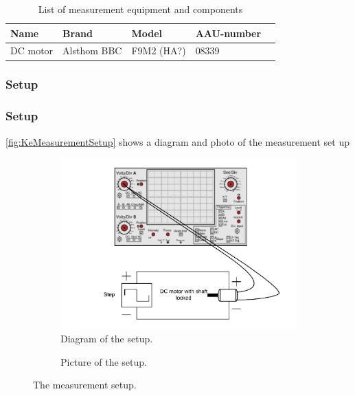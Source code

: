 \begin{table}[htbp]
	\centering
	\caption{List of measurement equipment and components}\label{tab_appendix:LaSetUp}
	
	\begin{tabularx}{\textwidth}{lXXXX}
		Name 				& Brand	& Model & AAU-number									\\ \toprule \rowcolor{lightGrey}
		
		DC motor & Alsthom BBC & F9M2 (HA?)& 08339 
	\end{tabularx}
\end{table}


\subsubsection*{Setup}

\subsubsection*{Setup}
\autoref{fig:KeMeasurementSetup} shows a diagram and photo of the measurement set up
\begin{figure}[htbp]
	\centering
	\begin{subfigure}{0.50\textwidth}
		\includegraphics[width=\textwidth]{figures/appendix/Motor&GearTests/RmLmDiagram}
		\caption{Diagram of the setup.} \label{fig:RmLmMeasurementDiagram}
	\end{subfigure}
	\begin{subfigure}{0.40\textwidth}
		\caption{Picture of the setup.} \label{fig:RmLmMeasurementPictures}
	\end{subfigure}
	\caption{The measurement setup.} \label{fig:RmLmMeasurementSetup}   
\end{figure}

